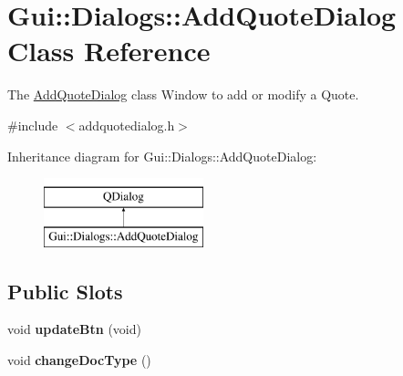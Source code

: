 \hypertarget{classGui_1_1Dialogs_1_1AddQuoteDialog}{\section{Gui\-:\-:Dialogs\-:\-:Add\-Quote\-Dialog Class Reference}
\label{classGui_1_1Dialogs_1_1AddQuoteDialog}
}


The \hyperlink{classGui_1_1Dialogs_1_1AddQuoteDialog}{Add\-Quote\-Dialog} class Window to add or modify a Quote.  




{\ttfamily \#include $<$addquotedialog.\-h$>$}

Inheritance diagram for Gui\-:\-:Dialogs\-:\-:Add\-Quote\-Dialog\-:\begin{figure}[H]
\begin{center}
\leavevmode
\includegraphics[height=2.000000cm]{d6/d43/classGui_1_1Dialogs_1_1AddQuoteDialog}
\end{center}
\end{figure}
\subsection*{Public Slots}
\begin{DoxyCompactItemize}
\item 
\hypertarget{classGui_1_1Dialogs_1_1AddQuoteDialog_a5fa7b833c2a4271cc637e7dd9ec72fff}{void {\bfseries update\-Btn} (void)}\label{classGui_1_1Dialogs_1_1AddQuoteDialog_a5fa7b833c2a4271cc637e7dd9ec72fff}

\item 
\hypertarget{classGui_1_1Dialogs_1_1AddQuoteDialog_a43a4371f321d2690e73190354146e174}{void {\bfseries change\-Doc\-Type} ()}\label{classGui_1_1Dialogs_1_1AddQuoteDialog_a43a4371f321d2690e73190354146e174}

\end{DoxyCompactItemize}
